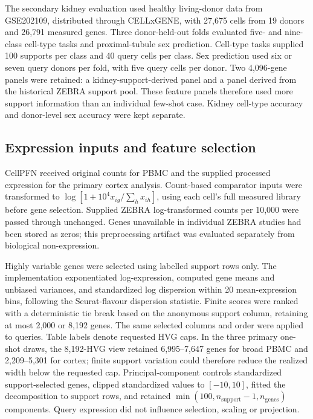 The secondary kidney evaluation used healthy living-donor data from GSE202109\cite{mcevoy2022kidney}, distributed through CELLxGENE, with 27,675 cells from 19 donors and 26,791 measured genes. Three donor-held-out folds evaluated five- and nine-class cell-type tasks and proximal-tubule sex prediction. Cell-type tasks supplied 100 supports per class and 40 query cells per class. Sex prediction used six or seven query donors per fold, with five query cells per donor. Two 4,096-gene panels were retained: a kidney-support-derived panel and a panel derived from the historical ZEBRA support pool. These feature panels therefore used more support information than an individual few-shot case. Kidney cell-type accuracy and donor-level sex accuracy were kept separate.

\subsection*{Expression inputs and feature selection}

CellPFN received original counts for PBMC and the supplied processed expression for the primary cortex analysis. Count-based comparator inputs were transformed to $\log[1+10^4x_{ig}/\sum_hx_{ih}]$, using each cell's full measured library before gene selection. Supplied ZEBRA log-transformed counts per 10,000 were passed through unchanged. Genes unavailable in individual ZEBRA studies had been stored as zeros; this preprocessing artifact was evaluated separately from biological non-expression.

Highly variable genes were selected using labelled support rows only. The implementation exponentiated log-expression, computed gene means and unbiased variances, and standardized log dispersion within 20 mean-expression bins, following the Seurat-flavour dispersion statistic. Finite scores were ranked with a deterministic tie break based on the anonymous support column, retaining at most 2,000 or 8,192 genes. The same selected columns and order were applied to queries. Table labels denote requested HVG caps. In the three primary one-shot draws, the 8,192-HVG view retained 6,995--7,647 genes for broad PBMC and 2,209--5,301 for cortex; finite support variation could therefore reduce the realized width below the requested cap. Principal-component controls standardized support-selected genes, clipped standardized values to $[-10,10]$, fitted the decomposition to support rows, and retained $\min(100,n_{\mathrm{support}}-1,n_{\mathrm{genes}})$ components. Query expression did not influence selection, scaling or projection.

